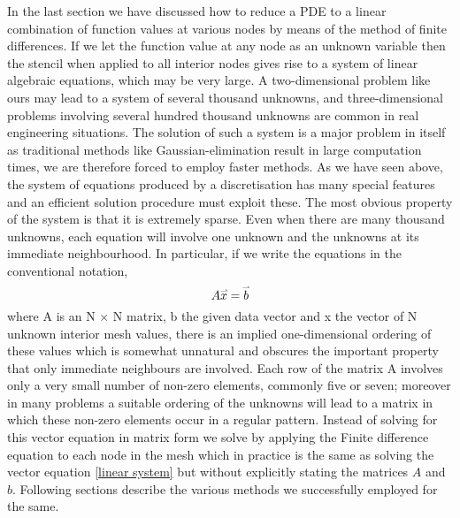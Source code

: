 In the last section we have discussed how to reduce a PDE to a linear combination of function values at various nodes by means of the method of finite differences. If we let the function value at any node as an unknown variable then the stencil when applied to all interior nodes gives rise to a system of linear algebraic equations, which may be very large. A two-dimensional problem like ours may lead to a system of several thousand unknowns, and three-dimensional problems involving several hundred thousand unknowns are common in real engineering situations. The solution of such a system is a major problem in itself as traditional methods like Gaussian-elimination result in large computation times, we are therefore forced to employ faster methods. As we have seen above, the system of equations produced by a discretisation has many special features and an eﬃcient solution procedure must exploit these. The most obvious property of the system is that it is extremely sparse. Even when there are many thousand unknowns, each equation will involve one unknown and the unknowns at its immediate neighbourhood. In particular, if we write the equations in the conventional notation,
\begin{equation} \label{linear system}
    A \accentset{\rightharpoonup}{x} = \accentset{\rightharpoonup}{b} 
\end{equation}
where A is an N × N matrix, b the given data vector and x the vector of N unknown interior mesh values, there is an implied one-dimensional ordering of these values which is somewhat unnatural and obscures the important property that only immediate neighbours are involved. Each row of the matrix A involves only a very small number of non-zero elements, commonly ﬁve or seven; moreover in many problems a suitable ordering of the unknowns will lead to a matrix in which these non-zero elements occur in a regular pattern. Instead of solving for this vector equation in matrix form we solve by applying the Finite difference equation to each node in the mesh which in practice is the same as solving the vector equation \ref{linear system} but without explicitly stating the matrices $A$ and $b$. Following sections describe the various methods we successfully employed for the same.\cite{mortonpde}
